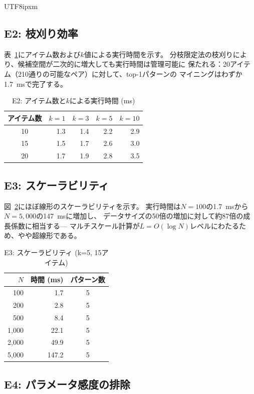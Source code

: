 \documentclass[conference]{IEEEtran}
\begin{document}
\begin{CJK}{UTF8}{ipxm}
\subsection{E2: 枝刈り効率}

表~\ref{tab:e2}にアイテム数および$k$値による実行時間を示す。
分枝限定法の枝刈りにより、候補空間が二次的に増大しても実行時間は管理可能に
保たれる：20アイテム（210通りの可能なペア）に対して、top-1パターンの
マイニングはわずか1.7~msで完了する。

\begin{table}[t]
\centering
\caption{E2: アイテム数と$k$による実行時間 (ms)}\label{tab:e2}
\begin{tabular}{crrrr}
\toprule
アイテム数 & $k=1$ & $k=3$ & $k=5$ & $k=10$ \\
\midrule
10 & 1.3 & 1.4 & 2.2 & 2.9 \\
15 & 1.5 & 1.7 & 2.6 & 3.0 \\
20 & 1.7 & 1.9 & 2.8 & 3.5 \\
\bottomrule
\end{tabular}
\end{table}

\subsection{E3: スケーラビリティ}

図~\ref{fig:e3}にほぼ線形のスケーラビリティを示す。
実行時間は$N=100$の1.7~msから$N=5{,}000$の147~msに増加し、
データサイズの50倍の増加に対して約87倍の成長係数に相当する---
マルチスケール計算が$L = O(\log N)$レベルにわたるため、やや超線形である。

\begin{table}[t]
\centering
\caption{E3: スケーラビリティ (k=5, 15アイテム)}\label{fig:e3}
\begin{tabular}{rrc}
\toprule
$N$ & 時間 (ms) & パターン数 \\
\midrule
100 & 1.7 & 5 \\
200 & 2.8 & 5 \\
500 & 8.4 & 5 \\
1,000 & 22.1 & 5 \\
2,000 & 49.9 & 5 \\
5,000 & 147.2 & 5 \\
\bottomrule
\end{tabular}
\end{table}

\subsection{E4: パラメータ感度の排除}


\end{CJK}
\end{document}
